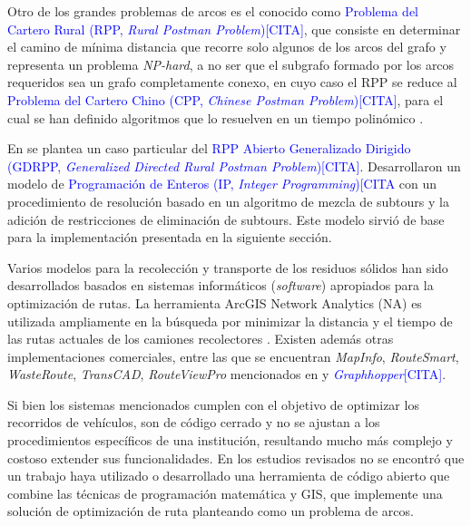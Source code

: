 \documentclass[conference,compsoc]{IEEEtran}
\begin{document}
Otro de los grandes problemas de arcos es el conocido como \textcolor{blue}{Problema del Cartero Rural (RPP, \textit{Rural Postman Problem})[CITA]}, que consiste en determinar el camino de mínima distancia que recorre solo algunos de los arcos del grafo y representa un problema \textit{NP-hard}, a no ser que el subgrafo formado por los arcos requeridos sea un grafo completamente conexo, en cuyo caso el RPP se reduce al \textcolor{blue}{Problema del Cartero Chino (CPP, \textit{Chinese Postman Problem})[CITA]}, para el cual se han definido algoritmos que lo resuelven en un tiempo polinómico \cite{CalvinoM2011CooperacionPanoramica}.

En \cite{Braier2017AnArgentina} se plantea un caso particular del \textcolor{blue}{RPP Abierto Generalizado Dirigido (GDRPP, \textit{Generalized Directed Rural Postman Problem})[CITA]}. Desarrollaron un modelo de \textcolor{blue}{Programación de Enteros (IP, \textit{Integer Programming})[CITA} con un procedimiento de resolución basado en un algoritmo de mezcla de subtours y la adición de restricciones de eliminación de subtours. Este modelo sirvió de base para la implementación presentada en la siguiente sección.

Varios modelos para la recolección y transporte de los residuos sólidos han sido desarrollados basados en sistemas informáticos (\textit{software}) apropiados para la optimización de rutas. La herramienta ArcGIS Network Analytics (NA) es utilizada ampliamente en la búsqueda por minimizar la distancia y el tiempo de las rutas actuales de los camiones recolectores \cite{Kallel2016UsingTunisia} \cite{Malakahmad2014SolidMalaysia}. Existen además otras implementaciones comerciales, entre las que se encuentran \textit{MapInfo}, \textit{RouteSmart}, \textit{WasteRoute}, \textit{TransCAD}, \textit{RouteViewPro} mencionados en \cite{Kallel2016UsingTunisia} y \textcolor{blue}{\textit{Graphhopper}[CITA]}.

Si bien los sistemas mencionados cumplen con el objetivo de optimizar los recorridos de vehículos, son de código cerrado y no se ajustan a los procedimientos específicos de una institución, resultando mucho más complejo y costoso extender sus funcionalidades. En los estudios revisados no se encontró que un trabajo haya utilizado o desarrollado una herramienta de código abierto que combine las técnicas de programación matemática y GIS, que implemente una solución de optimización de ruta planteando como un problema de arcos. 
\end{document}
